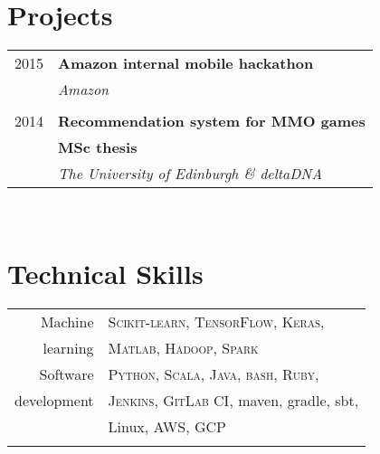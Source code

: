 \documentclass[10pt]{article} %
\begin{document}
{\begin{minipage}[t]{0.44\textwidth}

\vspace{0.5cm}
\section{Projects}

\begin{tabular}{rl}

2015     & \textbf{Amazon internal mobile hackathon}\\
& \textit{Amazon}\\
&\\
2014     & \textbf{Recommendation system for MMO games}\\
         & \textbf{MSc thesis}\\
& \textit{The University of Edinburgh \& deltaDNA}\\

\end{tabular}\\[10pt]


\vspace{0.5cm}
\section{Technical Skills}

\begin{tabular}{rl}
Machine & \textsc{Scikit-learn}, \textsc{TensorFlow}, \textsc{Keras},\\
learning & \textsc{Matlab}, \textsc{Hadoop}, \textsc{Spark}\\
\rule{0pt}{4ex}   
Software & \textsc{Python}, \textsc{Scala}, \textsc{Java}, \textsc{bash}, \textsc{Ruby},\\
development & \textsc{Jenkins}, \textsc{GitLab CI}, maven, gradle, sbt,\\
& Linux, \textsc{AWS}, \textsc{GCP}\\
& \\
\end{tabular}


\end{minipage}}
\end{document}
